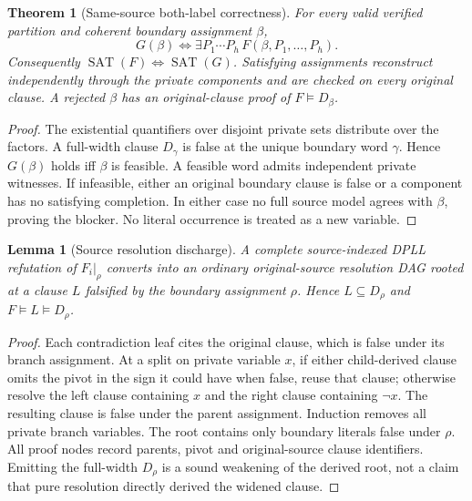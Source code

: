 \documentclass[11pt]{article}
\newtheorem{theorem}{Theorem}
\newtheorem{lemma}{Lemma}
\begin{document}
\begin{theorem}[Same-source both-label correctness]
For every valid verified partition and coherent boundary assignment $\beta$,
\[
G(\beta)\iff\exists P_1\cdots P_h\, F(\beta,P_1,\ldots,P_h).
\]
Consequently $\operatorname{SAT}(F)\iff\operatorname{SAT}(G)$. Satisfying assignments reconstruct independently through the private components and are checked on every original clause. A rejected $\beta$ has an original-clause proof of $F\models D_\beta$.
\end{theorem}
\begin{proof}
The existential quantifiers over disjoint private sets distribute over the factors. A full-width clause $D_\gamma$ is false at the unique boundary word $\gamma$. Hence $G(\beta)$ holds iff $\beta$ is feasible. A feasible word admits independent private witnesses. If infeasible, either an original boundary clause is false or a component has no satisfying completion. In either case no full source model agrees with $\beta$, proving the blocker. No literal occurrence is treated as a new variable.
\end{proof}

\begin{lemma}[Source resolution discharge]
A complete source-indexed DPLL refutation of $F_i|_\rho$ converts into an ordinary original-source resolution DAG rooted at a clause $L$ falsified by the boundary assignment $\rho$. Hence $L\subseteq D_\rho$ and $F\models L\models D_\rho$.
\end{lemma}
\begin{proof}
Each contradiction leaf cites the original clause, which is false under its branch assignment. At a split on private variable $x$, if either child-derived clause omits the pivot in the sign it could have when false, reuse that clause; otherwise resolve the left clause containing $x$ and the right clause containing $\neg x$. The resulting clause is false under the parent assignment. Induction removes all private branch variables. The root contains only boundary literals false under $\rho$. All proof nodes record parents, pivot and original-source clause identifiers. Emitting the full-width $D_\rho$ is a sound weakening of the derived root, not a claim that pure resolution directly derived the widened clause.
\end{proof}
\end{document}
